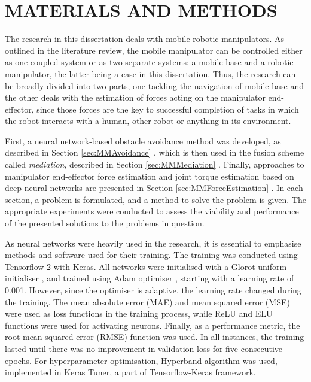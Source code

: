 \chapter{MATERIALS AND METHODS}
\label{chap:Materials}

The research in this dissertation deals with mobile robotic manipulators. As outlined in the literature review, the mobile manipulator can be controlled either as one coupled system or as two separate systems: a mobile base and a robotic manipulator, the latter being a case in this dissertation. Thus, the research can be broadly divided into two parts, one tackling the navigation of mobile base and the other deals with the estimation of forces acting on the manipulator end-effector, since those forces are the key to successful completion of tasks in which the robot interacts with a human, other robot or anything in its environment. 

First, a neural network-based obstacle avoidance method was developed, as described in Section \ref{sec:MMAvoidance} \cite{Kruzic2020,Kruzic2018}, which is then used in the fusion scheme called \emph{mediation}, described in Section \ref{sec:MMMediation} \cite{Music2019}. Finally, approaches to manipulator end-effector force estimation and joint torque estimation based on deep neural networks are presented in Section \ref{sec:MMForceEstimation} \cite{Kruzic2020a,Kruzic2021}. In each section, a problem is formulated, and a method to solve the problem is given. The appropriate experiments were conducted to assess the viability and performance of the presented solutions to the problems in question.

As neural networks were heavily used in the research, it is essential to emphasise methods and software used for their training. The training was conducted using Tensorflow 2 with Keras. All networks were initialised with a Glorot uniform initialiser \cite{Glorot2010}, and trained using Adam optimiser \cite{Kingma2014}, starting with a learning rate of 0.001. However, since the optimiser is adaptive, the learning rate changed during the training. The mean absolute error (MAE) and mean squared error (MSE) were used as loss functions in the training process, while ReLU and ELU functions were used for activating neurons. Finally, as a performance metric, the root-mean-squared error (RMSE) function was used. In all instances, the training lasted until there was no improvement in validation loss for five consecutive epochs. For hyperparameter optimisation, Hyperband algorithm\cite{Li2018} was used, implemented in Keras Tuner, a part of Tensorflow-Keras framework.


